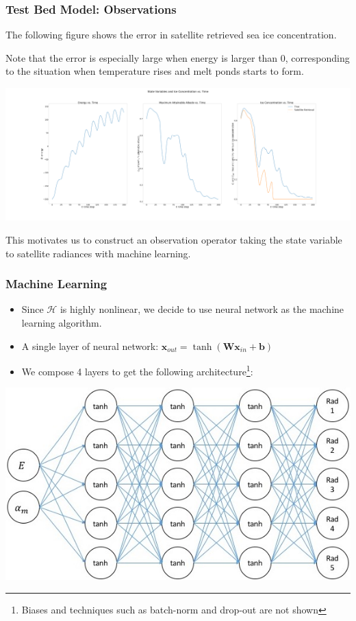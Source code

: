 \documentclass{beamer}
\newcommand{\vx}{\bm{x}}
\newcommand{\vW}{\bm{W}}
\newcommand{\vb}{\bm{b}}
\newcommand{\cH}{\mathcal{H}}
\begin{document}
\begin{frame}
\frametitle{Test Bed Model: Observations}
The following figure shows the error in satellite retrieved sea ice concentration.\par
Note that the error is especially large when energy is larger than $0$, corresponding to the situation when temperature rises and melt ponds starts to form.
\begin{center}
\includegraphics[width=\linewidth]{Figures/StateAndConcentration.png}
\end{center}
This motivates us to construct an observation operator taking the state variable to satellite radiances with machine learning.
\end{frame}

\begin{frame}
\frametitle{Machine Learning}
\begin{itemize}
\item
Since $\cH$ is highly nonlinear, we decide to use neural network as the machine learning algorithm.
\item A single layer of neural network: $\vx_{out}=\tanh(\vW \vx_{in}+\vb)$
\item
We compose 4 layers to get the following architecture\footnote{Biases and techniques such as batch-norm and drop-out are not shown}:
\end{itemize}
\centering
\includegraphics[width=0.6\linewidth]{Figures/FNN.jpeg}

\end{frame}
\end{document}
